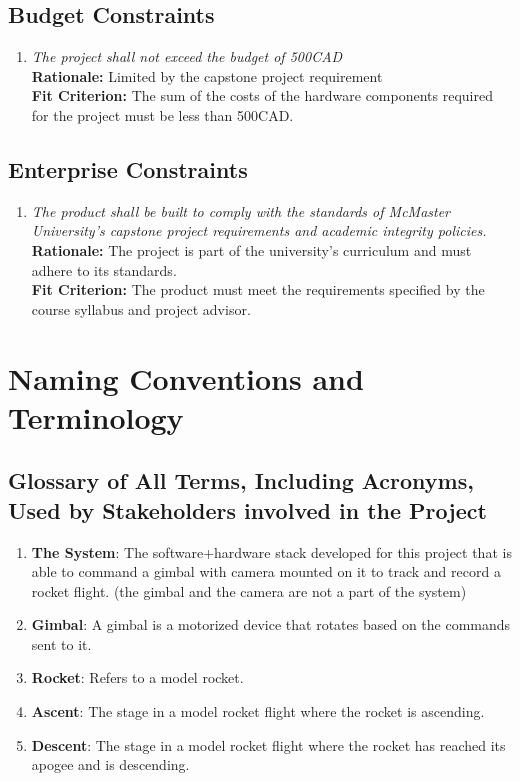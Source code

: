 \documentclass[12pt]{article}
\begin{document}
\subsection{Budget Constraints}

\begin{enumerate}[label=BDGT \arabic*., wide=0pt, leftmargin=*]
  \item \emph{The project shall not exceed the budget of 500CAD}\\[2mm]
        {\bf Rationale:} Limited by the capstone project requirement\\
        {\bf Fit Criterion:} The sum of the costs of the hardware components required for the project must be less than 500CAD.
\end{enumerate}

\subsection{Enterprise Constraints}

\begin{enumerate}[label=ENTP \arabic*., wide=0pt, leftmargin=*]
  \item \emph{The product shall be built to comply with the standards
          of McMaster University's capstone project requirements and
          academic integrity policies.}\\[2mm]
        {\bf Rationale:} The project is part of the university's
        curriculum and must adhere to its standards.\\
        {\bf Fit Criterion:} The product must meet the requirements
        specified by the course syllabus and project advisor.
\end{enumerate}

\section{Naming Conventions and Terminology}
\subsection{Glossary of All Terms, Including Acronyms, Used by Stakeholders
  involved in the Project}

\begin{enumerate}
  \item \textbf{The System}: The software+hardware stack developed for this project that is able to command a gimbal with camera mounted on it to track and record a rocket flight. (the gimbal and the camera are not a part of the system)
  \item \textbf{Gimbal}: A gimbal is a motorized device that rotates based on the commands sent to it.
  \item \textbf{Rocket}: Refers to a model rocket.
  \item \textbf{Ascent}: The stage in a model rocket flight where the rocket is ascending.
  \item \textbf{Descent}: The stage in a model rocket flight where the rocket has reached its apogee and is descending.
\end{enumerate}
\end{document}
